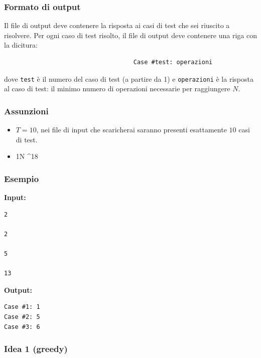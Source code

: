 \subsubsection*{Formato di output}

Il file di output deve contenere la risposta ai casi di test che sei riuscito a risolvere.  
Per ogni caso di test risolto, il file di output deve contenere una riga con la dicitura:

\begin{center}
	\begin{verbatim}
									Case #test: operazioni
	\end{verbatim}
	
\end{center}



dove \texttt{test} è il numero del caso di test (a partire da 1) e \texttt{operazioni} è la risposta al caso di test: il minimo numero di operazioni necessarie per raggiungere \(N\).

\subsubsection*{Assunzioni}

\begin{itemize}
	\item $T=10$, nei file di input che scaricherai saranno presenti esattamente $10$ casi di test.
	\item 1\le N ^{18}
\end{itemize}

\subsubsection*{Esempio}  

\smallskip  
\textbf{Input:}  
\begin{verbatim}
2

2

5

13
\end{verbatim}

\smallskip  
\textbf{Output:}  
\begin{verbatim}
Case #1: 1
Case #2: 5
Case #3: 6
\end{verbatim}


\subsubsection*{Idea 1 (greedy)}

